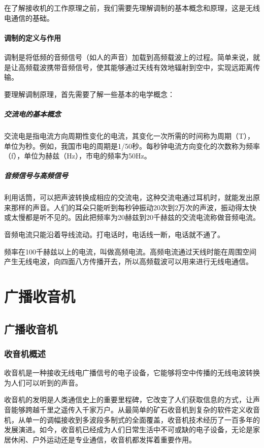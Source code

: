 \documentclass[12pt,UTF8]{ctexbook}
\begin{document}
在了解接收机的工作原理之前，我们需要先理解调制的基本概念和原理，这是无线电通信的基础。

\subsection{调制的定义与作用}
调制是将低频的音频信号（如人的声音）加载到高频载波上的过程。简单来说，就是让高频载波携带音频信号，使其能够通过天线有效地辐射到空中，实现远距离传输。

要理解调制原理，首先需要了解一些基本的电学概念：

\subsubsection{交流电的基本概念}
交流电是指电流方向周期性变化的电流，其变化一次所需的时间称为周期（T），单位为秒。例如，我国市电的周期是1/50秒。每秒钟电流方向变化的次数称为频率（f），单位为赫兹（Hz），市电的频率为50Hz。

\subsubsection{音频信号与高频信号}
利用话筒，可以把声波转换成相应的交流电，这种交流电通过耳机时，就能发出原来那样的声音。人们的耳朵只能听到每秒钟振动20次到2万次的声波，振动得太快或太慢都是听不见的。因此把频率为20赫兹到20千赫兹的交流电流称做音频电流。

音频电流只能沿着导线流动。打电话时，电话线一断，电话就不通了。

频率在100千赫兹以上的电流，叫做高频电流。高频电流通过天线时能在周围空间产生无线电波，向四面八方传播开去，所以高频载波可以用来进行无线电通信。

\part{广播收音机}

\chapter{广播收音机}

\section{收音机概述}

收音机是一种接收无线电广播信号的电子设备，它能够将空中传播的无线电波转换为人们可以听到的声音。

收音机的发明是人类通信史上的重要里程碑，它改变了人们获取信息的方式，让声音能够跨越千里之遥传入千家万户。从最简单的矿石收音机到复杂的软件定义收音机，从单一的调幅接收到多波段多制式的全面覆盖，收音机技术经历了一百多年的发展演进。如今，收音机已经成为人们日常生活中不可或缺的电子设备，无论是家居休闲、户外运动还是专业通信，收音机都发挥着重要作用。
\end{document}

